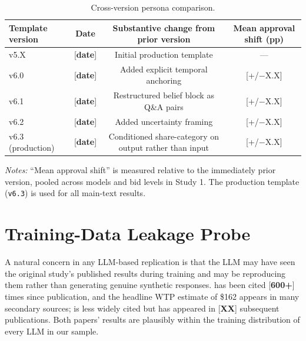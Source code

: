 \documentclass[12pt]{article}
\begin{document}
\begin{table}[h]
    \centering
    \caption{Cross-version persona comparison.}
    \label{tab:persona-version}
    \begin{threeparttable}
    \begin{tabular}{lccc}
        \toprule
        Template version & Date & Substantive change from prior version & Mean approval shift (pp) \\
        \midrule
        v5.X            & [\textbf{date}] & Initial production template                                    & --- \\
        v6.0            & [\textbf{date}] & Added explicit temporal anchoring                              & [+/$-$X.X] \\
        v6.1            & [\textbf{date}] & Restructured belief block as Q\&A pairs                        & [+/$-$X.X] \\
        v6.2            & [\textbf{date}] & Added uncertainty framing                                      & [+/$-$X.X] \\
        v6.3 (production) & [\textbf{date}] & Conditioned share-category on output rather than input        & [+/$-$X.X] \\
        \bottomrule
    \end{tabular}
    \begin{tablenotes}\footnotesize
        \item \textit{Notes:} ``Mean approval shift'' is measured relative to the immediately prior version, pooled across models and bid levels in Study 1. The production template (\texttt{v6.3}) is used for all main-text results.
    \end{tablenotes}
    \end{threeparttable}
\end{table}

\section{Training-Data Leakage Probe}\label{app:leakage}

A natural concern in any LLM-based replication is that the LLM may have seen the original study's published results during training and may be reproducing them rather than generating genuine synthetic responses. \textcite{Aldy2012} has been cited [\textbf{600+}] times since publication, and the headline WTP estimate of \$162 appears in many secondary sources; \textcite{Giguere2020} is less widely cited but has appeared in [\textbf{XX}] subsequent publications. Both papers' results are plausibly within the training distribution of every LLM in our sample.
\end{document}
